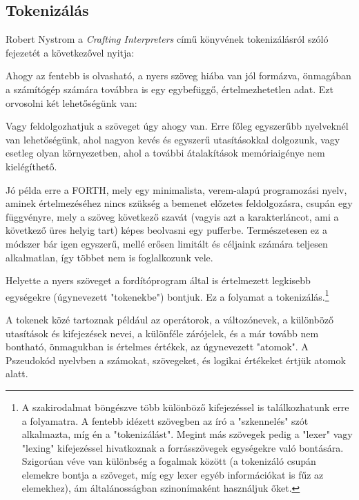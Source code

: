 \subsection{Tokenizálás}

Robert Nystrom a \textit{Crafting Interpreters}\cite{crafting} című könyvének tokenizálásról szóló fejezetét a következővel nyitja:


Ahogy az fentebb is olvasható, a nyers szöveg hiába van jól formázva, önmagában a számítógép számára továbbra is egy egybefüggő, értelmezhetetlen adat. Ezt orvosolni két lehetőségünk van:

Vagy feldolgozhatjuk a szöveget úgy ahogy van. Erre főleg egyszerűbb nyelveknél van lehetőségünk, ahol nagyon kevés és egyszerű utasításokkal dolgozunk, vagy esetleg olyan környezetben, ahol a további átalakítások memóriaigénye nem kielégíthető.

Jó példa erre a FORTH, mely egy minimalista, verem-alapú programozási nyelv, aminek értelmezéséhez nincs szükség a bemenet előzetes feldolgozásra, csupán egy függvényre, mely a szöveg következő szavát (vagyis azt a karakterláncot, ami a következő üres helyig tart) képes beolvasni egy pufferbe. Természetesen ez a módszer bár igen egyszerű, mellé erősen limitált és céljaink számára teljesen alkalmatlan, így többet nem is foglalkozunk vele.

Helyette a nyers szöveget a fordítóprogram által is értelmezett legkisebb egységekre (úgynevezett "tokenekbe") bontjuk. Ez a folyamat a tokenizálás.\footnote{A szakirodalmat böngészve több különböző kifejezéssel is találkozhatunk erre a folyamatra. A fentebb idézett szövegben az író a "szkennelés" szót alkalmazta, míg én a "tokenizálást". Megint más szövegek pedig a "lexer" vagy "lexing" kifejezéssel hivatkoznak a forrásszövegek egységekre való bontására. Szigorúan véve van különbség a fogalmak között (a tokenizáló csupán elemekre bontja a szöveget, míg egy lexer egyéb információkat is fűz az elemekhez), ám általánosságban szinonímaként használjuk őket.}

A tokenek közé tartoznak például az operátorok, a változónevek, a különböző utasítások és kifejezések nevei, a különféle zárójelek, és a már tovább nem bontható, önmagukban is értelmes értékek, az úgynevezett "atomok". A Pszeudokód nyelvben a számokat, szövegeket, és logikai értékeket értjük atomok alatt.

